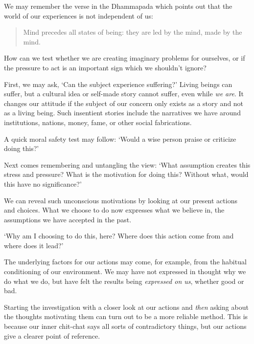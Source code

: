 We may remember the verse in the Dhammapada which points out that the
world of our experiences is not independent of us:

\begin{quote}
Mind precedes all states of being: they are led by the mind, made by the
mind.

\bigskip

\end{quote}

How can we test whether we are creating imaginary problems for
ourselves, or if the pressure to act is an important sign which we
shouldn't ignore?

First, we may ask, `Can the subject experience suffering?' Living beings
can suffer, but a cultural idea or self-made story cannot suffer, even
while \emph{we are}. It changes our attitude if the subject of our
concern only exists as a story and not as a living being. Such
insentient stories include the narratives we have around institutions,
nations, money, fame, or other social fabrications.

A quick moral safety test may follow: `Would a wise person praise or
criticize doing this?'

Next comes remembering and untangling the view: `What assumption creates
this stress and pressure? What is the motivation for doing this? Without
what, would this have no significance?'

We can reveal such unconscious motivations by looking at our present
actions and choices. What we choose to do now expresses what we believe
in, the assumptions we have accepted in the past.

`Why am I choosing to do this, here? Where does this action come from
and where does it lead?'

The underlying factors for our actions may come, for example, from the
habitual conditioning of our environment. We may have not expressed in
thought why we do what we do, but have felt the results being
\emph{expressed on us}, whether good or bad.

Starting the investigation with a closer look at our actions and
\emph{then} asking about the thoughts motivating them can turn out to be
a more reliable method. This is because our inner chit-chat says all
sorts of contradictory things, but our actions give a clearer point of
reference.


